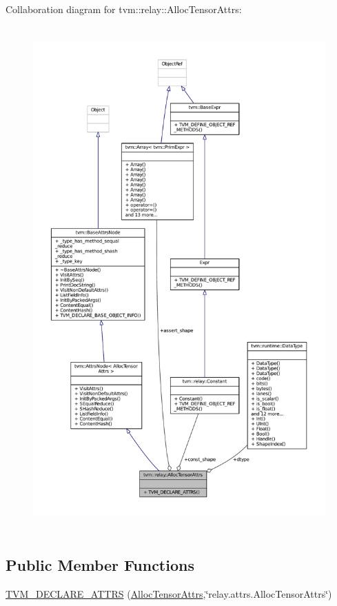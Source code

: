 Collaboration diagram for tvm\+:\+:relay\+:\+:Alloc\+Tensor\+Attrs\+:
\nopagebreak
\begin{figure}[H]
\begin{center}
\leavevmode
\includegraphics[height=550pt]{structtvm_1_1relay_1_1AllocTensorAttrs__coll__graph}
\end{center}
\end{figure}
\subsection*{Public Member Functions}
\begin{DoxyCompactItemize}
\item 
\hyperlink{structtvm_1_1relay_1_1AllocTensorAttrs_a28d03370b5a01db81cdfe04abe9f9324}{T\+V\+M\+\_\+\+D\+E\+C\+L\+A\+R\+E\+\_\+\+A\+T\+T\+RS} (\hyperlink{structtvm_1_1relay_1_1AllocTensorAttrs}{Alloc\+Tensor\+Attrs},\char`\"{}relay.\+attrs.\+Alloc\+Tensor\+Attrs\char`\"{})
\end{DoxyCompactItemize}
